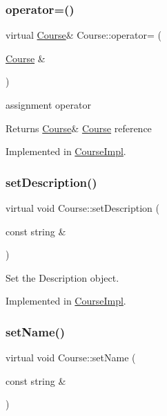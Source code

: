 \subsubsection{\texorpdfstring{operator=()}{operator=()}}
{\footnotesize\ttfamily virtual \hyperlink{classCourse}{Course}\& Course\+::operator= (\begin{DoxyParamCaption}\item[{\hyperlink{classCourse}{Course} \&}]{ }\end{DoxyParamCaption})\hspace{0.3cm}{\ttfamily [pure virtual]}}



assignment operator 

\begin{DoxyReturn}{Returns}
\hyperlink{classCourse}{Course}\& \hyperlink{classCourse}{Course} reference 
\end{DoxyReturn}


Implemented in \hyperlink{classCourseImpl_a2a35e597103c55fd43b68e78c76952e6}{Course\+Impl}.

\mbox{\label{classCourse_a67f5badeddc228e5a4e4dde35f794d97}} 
\subsubsection{\texorpdfstring{set\+Description()}{setDescription()}}
{\footnotesize\ttfamily virtual void Course\+::set\+Description (\begin{DoxyParamCaption}\item[{const string \&}]{ }\end{DoxyParamCaption})\hspace{0.3cm}{\ttfamily [pure virtual]}}



Set the Description object. 



Implemented in \hyperlink{classCourseImpl_a38d1a7f80f078828f9f2795aa4219e91}{Course\+Impl}.

\mbox{\label{classCourse_abf95977e0ba0285c17cac6845f78c4e8}} 
\subsubsection{\texorpdfstring{set\+Name()}{setName()}}
{\footnotesize\ttfamily virtual void Course\+::set\+Name (\begin{DoxyParamCaption}\item[{const string \&}]{ }\end{DoxyParamCaption})\hspace{0.3cm}{\ttfamily [pure virtual]}}



